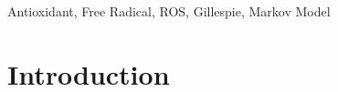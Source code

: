 \documentclass[preprint,12pt,authoryear]{elsarticle}
\begin{document}
\begin{frontmatter}
\begin{abstract}
%
%
%
%
%

\end{abstract}

\begin{keyword}
Antioxidant, Free Radical, ROS, Gillespie, Markov Model



\end{keyword}

\end{frontmatter}


\section{Introduction}
\label{}
\end{document}
